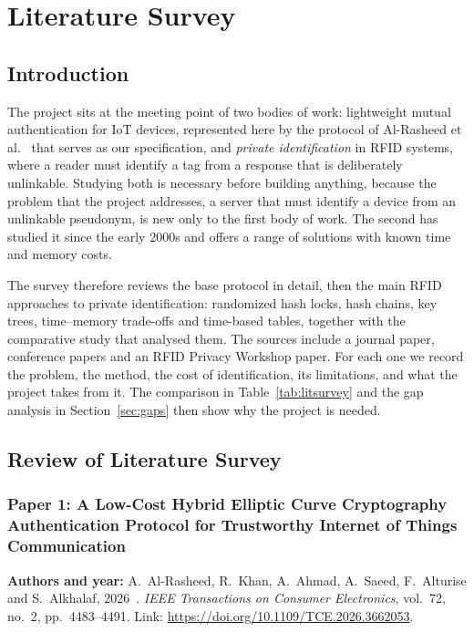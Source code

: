 \chapter{Literature Survey}

\section{Introduction}
The project sits at the meeting point of two bodies of work: lightweight mutual authentication for IoT devices, represented here by the protocol of Al-Rasheed et al.~\cite{base} that serves as our specification, and \emph{private identification} in RFID systems, where a reader must identify a tag from a response that is deliberately unlinkable. Studying both is necessary before building anything, because the problem that the project addresses, a server that must identify a device from an unlinkable pseudonym, is new only to the first body of work. The second has studied it since the early 2000s and offers a range of solutions with known time and memory costs.

The survey therefore reviews the base protocol in detail, then the main RFID approaches to private identification: randomized hash locks, hash chains, key trees, time--memory trade-offs and time-based tables, together with the comparative study that analysed them. The sources include a journal paper, conference papers and an RFID Privacy Workshop paper. For each one we record the problem, the method, the cost of identification, its limitations, and what the project takes from it. The comparison in Table~\ref{tab:litsurvey} and the gap analysis in Section~\ref{sec:gaps} then show why the project is needed.

\section{Review of Literature Survey}

\subsection*{Paper 1: A Low-Cost Hybrid Elliptic Curve Cryptography Authentication Protocol for Trustworthy Internet of Things Communication}
\textbf{Authors and year:} A.~Al-Rasheed, R.~Khan, A.~Ahmad, A.~Saeed, F.~Alturise and S.~Alkhalaf, 2026~\cite{base}. \emph{IEEE Transactions on Consumer Electronics}, vol.~72, no.~2, pp.~4483--4491. Link: \url{https://doi.org/10.1109/TCE.2026.3662053}.

